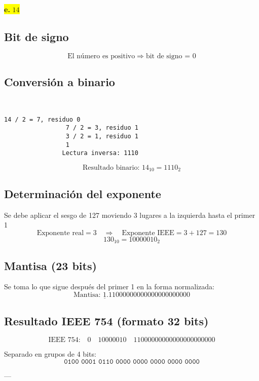\documentclass[a4paper,12pt]{article}
\begin{document}
		\begin{center}	
			\colorbox{yellow}{{\textbf{e.} $14$}}
			
			\subsection*{Bit de signo}
			
			\[
			\text{El número es positivo} \Rightarrow \text{bit de signo = } \boxed{0}
			\]
			
			\subsection*{Conversión a binario}
			~~~~~~~
			\begin{center}
		    \begin{Verbatim}[formatcom=\centering]
		    	14 / 2 = 7, residuo 0
		    	 7 / 2 = 3, residuo 1
		    	 3 / 2 = 1, residuo 1
		    	 1
		    	Lectura inversa: 1110
		    \end{Verbatim}
			\end{center}
			
			
			
			\[
			\text{Resultado binario: }14_{10} = 1110_2
			\]
			
			\subsection*{Determinación del exponente}
			
			Se debe aplicar el sesgo de 127 moviendo 3 lugares a la izquierda hasta el primer 1
			\vspace{-0.5em}
			\[
			\text{Exponente real} = 3 \quad \Rightarrow \quad \text{Exponente IEEE} = 3 + 127 = 130
			\]
			\vspace{-0.5em}
			\[
			130_{10} = 10000010_2
			\]
			
			\subsection*{Mantisa (23 bits)}
			
			Se toma lo que sigue después del primer 1 en la forma normalizada:
			\vspace{-0.5em}
			\[
			\text{Mantisa: } \underline{1}.11000000000000000000000
			\]
			
			\subsection*{Resultado IEEE 754 (formato 32 bits)}
			
			\[
			\text{IEEE 754:} \quad 
			\boxed{0} \quad \boxed{10000010} \quad \boxed{11000000000000000000000}
			\]
			
			Separado en grupos de 4 bits:
			\vspace{-0.5em}
			\[
			\texttt{0100\ 0001\ 0110\ 0000\ 0000\ 0000\ 0000\ 0000}
			\]
			
			---	
		\end{center}
\end{document}
